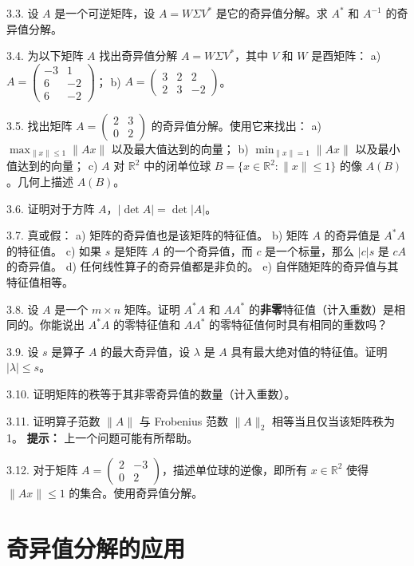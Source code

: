 3.3. 设 $A$ 是一个可逆矩阵，设 $A = W \Sigma V^*$ 是它的奇异值分解。求 $A^*$ 和 $A^{-1}$ 的奇异值分解。

3.4. 为以下矩阵 $A$ 找出奇异值分解 $A = W \Sigma V^*$，其中 $V$ 和 $W$ 是酉矩阵：
a) $A = \begin{pmatrix} -3 & 1 \\ 6 & -2 \\ 6 & -2 \end{pmatrix}$；
b) $A = \begin{pmatrix} 3 & 2 & 2 \\ 2 & 3 & -2 \end{pmatrix}$。

3.5. 找出矩阵 $A = \begin{pmatrix} 2 & 3 \\ 0 & 2 \end{pmatrix}$ 的奇异值分解。使用它来找出：
a) $\max_{\|x\| \leq 1} \|Ax\|$ 以及最大值达到的向量；
b) $\min_{\|x\|=1} \|Ax\|$ 以及最小值达到的向量；
c) $A$ 对 $\mathbb{R}^2$ 中的闭单位球 $B = \{x \in \mathbb{R}^2 : \|x\| \leq 1\}$ 的像 $A(B)$。几何上描述 $A(B)$。

3.6. 证明对于方阵 $A$，$|\det A| = \det |A|$。

3.7. 真或假：
a) 矩阵的奇异值也是该矩阵的特征值。
b) 矩阵 $A$ 的奇异值是 $A^*A$ 的特征值。
c) 如果 $s$ 是矩阵 $A$ 的一个奇异值，而 $c$ 是一个标量，那么 $|c|s$ 是 $cA$ 的奇异值。
d) 任何线性算子的奇异值都是非负的。
e) 自伴随矩阵的奇异值与其特征值相等。

3.8. 设 $A$ 是一个 $m \times n$ 矩阵。证明 $A^*A$ 和 $AA^*$ 的\textbf{非零}特征值（计入重数）是相同的。你能说出 $A^*A$ 的零特征值和 $AA^*$ 的零特征值何时具有相同的重数吗？

3.9. 设 $s$ 是算子 $A$ 的最大奇异值，设 $\lambda$ 是 $A$ 具有最大绝对值的特征值。证明 $|\lambda| \leq s$。

3.10. 证明矩阵的秩等于其非零奇异值的数量（计入重数）。





3.11. 证明算子范数 $\|A\|$ 与 Frobenius 范数 $\|A\|_2$ 相等当且仅当该矩阵秩为 1。
\textbf{提示：} 上一个问题可能有所帮助。

3.12. 对于矩阵 $A = \begin{pmatrix} 2 & -3 \\ 0 & 2 \end{pmatrix}$，描述单位球的逆像，即所有 $x \in \mathbb{R}^2$ 使得 $\|Ax\| \leq 1$ 的集合。使用奇异值分解。

\section{奇异值分解的应用}


